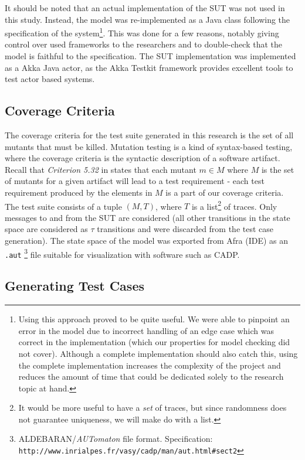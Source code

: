 \documentclass{article}
\begin{document}
			It should be noted that an actual implementation of the SUT was not used in this study. Instead, the model was re-implemented as a Java class following the specification of the system\footnote{Using this approach proved to be quite useful. We were able to pinpoint an error in the model due to incorrect handling of an edge case which was correct in the implementation (which our properties for model checking did not cover). Although a complete implementation should also catch this, using the complete implementation increases the complexity of the project and reduces the amount of time that could be dedicated solely to the research topic at hand. }. This was done for a few reasons, notably giving control over used frameworks to the researchers and to double-check that the model is faithful to the specification. The SUT implementation was implemented as a Akka Java actor, as the Akka Testkit framework provides excellent tools to test actor based systems.

		\subsection{Coverage Criteria}
			\label{sec:coveragecrit}
			The coverage criteria for the test suite generated in this research is the set of all mutants that must be killed. Mutation testing is a kind of syntax-based testing, where the coverage criteria is the syntactic description of a software artifact. Recall that \textit{Criterion 5.32} in \citet{ammann2008introduction} states that each mutant $m \in M$ where $M$ is the set of mutants for a given artifact will lead to a test requirement \-- each test requirement produced by the elements in $M$ is a part of our coverage criteria.
			The test suite consists of a tuple $(M, T)$, where $T$ is a list\footnote{It would be more useful to have a \textit{set} of traces, but since randomness does not guarantee uniqueness, we will make do with a list.} of traces. Only messages to and from the SUT are considered (all other transitions in the state space are considered as $\tau$ transitions and were discarded from the test case generation). The state space of the model was exported from Afra (\Rebeca IDE) as an \texttt{.aut}
			\footnote{ALDEBARAN/\textit{AUTomaton} file format. Specification: \texttt{http://www.inrialpes.fr/vasy/cadp/man/aut.html\#sect2}} file suitable for visualization with software such as CADP.

		\subsection{Generating Test Cases}
			\label{sec:method_testgen}
\end{document}
